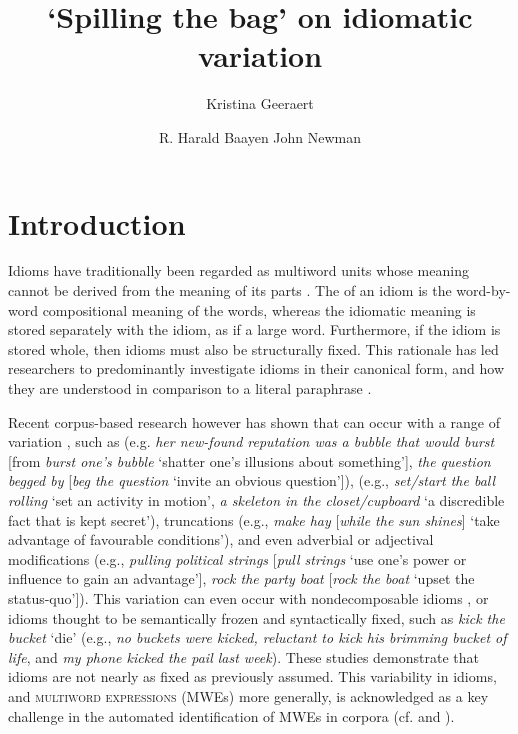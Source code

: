 \documentclass[output=paper
,modfonts
,nonflat]{langsci/langscibook}
\title{`Spilling the bag' on idiomatic variation}
\author{%
 Kristina Geeraert\affiliation{KU Leuven}\and 
 R. Harald Baayen\affiliation{University of T\"ubingen \& University of Alberta}\lastand 
 John Newman\affiliation{University of Alberta \& Monash University}
}
\begin{document}
\maketitle
\label{GEERAERT-CHAPTER}

\section{Introduction} 


Idioms  have traditionally been regarded as multiword units  whose meaning cannot be derived from the meaning of its parts \citep{BobrowBell1973}. The  of an idiom is the word-by-word compositional  meaning of the words, whereas the idiomatic meaning is stored separately with the idiom, as if a large word. Furthermore, if the idiom is stored whole, then idioms must also be structurally fixed. This rationale has led researchers to predominantly investigate idioms in their canonical form, and how they are understood in comparison to a literal paraphrase \citep{SwinneyCutler1979, Gibbs1980, CacciariTabossi1988, TitoneConnine1999}.

Recent corpus-based research however has shown that  can occur with a range of variation   \citep{Moon1998, Barlow2000, Langlotz2006, Schroder2013}, such as  (e.g. \textit{her new-found reputation was a bubble that would burst} [from \textit{burst one's bubble} `shatter one's illusions about something'], \textit{the question begged by} [\textit{beg the question} `invite an obvious question']),  (e.g., \textit{set/start the ball rolling} `set an activity in motion', \textit{a skeleton in the closet/cupboard} `a discredible fact that is kept secret'), truncations  (e.g., \textit{make hay} [\textit{while the sun shines}] `take advantage of favourable conditions'), and even adverbial or adjectival modifications  (e.g., \textit{pulling political strings} [\textit{pull strings} `use one's power or influence to gain an advantage'], \textit{rock the party boat} [\textit{rock the boat} `upset the status-quo']). This variation can even occur with nondecomposable idioms \citep{Duffley2013}, or idioms thought to be semantically frozen and syntactically fixed, such as \textit{kick the bucket} `die' (e.g., \textit{no buckets were kicked, reluctant to kick his brimming bucket of life}, and \textit{my phone kicked the pail last week}). These studies demonstrate that idioms are not nearly as fixed as previously assumed. This variability in idioms, and \textsc{multiword expressions} (MWEs)  more generally, is acknowledged as a key challenge in the automated identification of MWEs in corpora (cf.   and  ).
\end{document}
